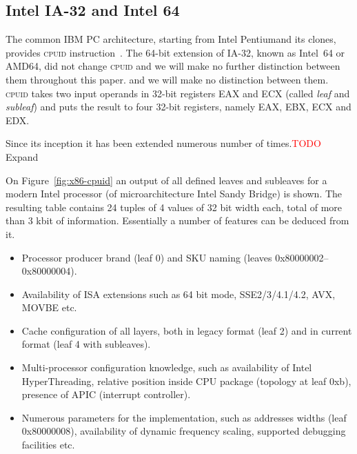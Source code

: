 \documentclass[a4paper,10pt,oneside,unicode]{article}
\newcommand{\cpuid}{\textsc{cpuid} }
\newcommand{\todo}[1][]{\textcolor{red}{TODO #1}}
\begin{document}
%



\subsection{Intel IA-32 and Intel 64}

The common IBM PC architecture, starting from Intel Pentium\texttrademark and its clones, provides \cpuid instruction~\cite{intelmanual-7vols, amd-sdm-vol1}. The 64-bit extension of IA-32, known as Intel~64 or AMD64, did not change \cpuid and we will make no further distinction between them throughout this paper. and we will make no distinction between them. \cpuid takes two input operands in 32-bit registers EAX and ECX (called \textit{leaf} and \textit{subleaf}) and puts the result to four 32-bit registers, namely EAX, EBX, ECX and EDX.

Since its inception it has been extended numerous number of times.\todo{Expand}

On Figure~\ref{fig:x86-cpuid} an output of all defined leaves and subleaves for a modern Intel processor (of microarchitecture Intel Sandy Bridge) is shown. The resulting table contains 24 tuples of 4 values of 32 bit width each, total of more than 3 kbit of information. Essentially a number of features can be deduced from it.

\begin{itemize}
    \item Processor producer brand (leaf 0) and SKU naming (leaves 0x80000002--0x80000004).
    \item Availability of ISA extensions such as 64 bit mode, SSE2/3/4.1/4.2, AVX, MOVBE etc.
    \item Cache configuration of all layers, both in legacy format (leaf 2) and in current format (leaf 4 with subleaves).
    \item Multi-processor configuration knowledge, such as availability of Intel HyperThreading, relative position inside {CPU} package (topology at leaf 0xb), presence of {APIC} (interrupt controller).
    \item Numerous parameters for the implementation, such as addresses widths (leaf 0x80000008), availability of dynamic frequency scaling, supported debugging facilities etc.
\end{itemize}
\end{document}
